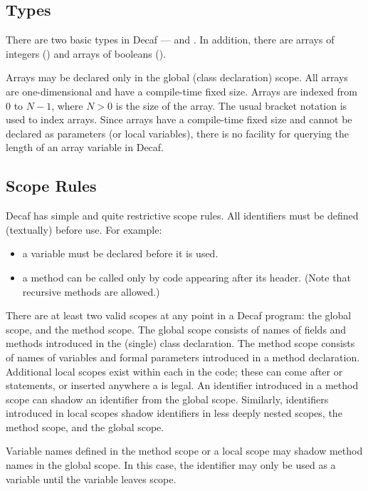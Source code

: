 \subsection*{Types}

There are two basic types in Decaf ---  and
.  In addition, there are arrays of integers () and arrays of booleans ().

Arrays may be declared only in the global (class declaration) scope.
All arrays are one-dimensional and have a compile-time fixed size.
Arrays are indexed from 0 to $N-1$, where $N > 0$ is the size of the
array.  The usual bracket notation is used to index arrays.  Since
arrays have a compile-time fixed size and cannot be declared as
parameters (or local variables), there is no facility for querying the
length of an array variable in Decaf.

\subsection*{Scope Rules}

Decaf has simple and quite restrictive scope rules.  All
identifiers must be defined (textually) before use.  For example:

 \begin{itemize}
  \item a variable must be declared before it is used.
  \item a method can be called only by code appearing after its header.
(Note that recursive methods are allowed.)
 \end{itemize}

There are at least two valid scopes at any point in a
Decaf program: the global scope, and the method
scope.  The global scope consists of names of fields and methods
introduced in the (single)  class declaration.  The
method scope consists of names of variables and formal parameters
introduced in a method declaration.  Additional local scopes exist within
each  in the code; these can come after  or 
statements, or inserted anywhere a  is
legal.  An identifier introduced in a method scope can shadow an
identifier from the global scope.  Similarly, identifiers introduced
in local scopes shadow identifiers in less deeply nested scopes, the
method scope, and the global scope.

Variable names defined in the method scope or a local scope may
shadow method names in the global scope.  In this case, the
identifier may only be used as a variable until the variable leaves
scope.

